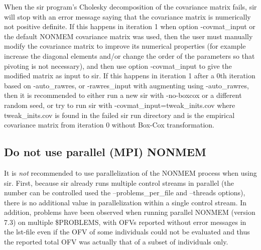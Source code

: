 When the sir program's Cholesky decomposition of the covariance matrix fails, 
sir will stop with an error message saying that the covariance matrix is numerically not positive definite. 
If this happens in iteration 1 when option -covmat\_input or the default NONMEM covariance matrix was used, 
then the user must manually modify the covariance matrix to improve its numerical properties (for example increase the diagonal elements
and/or change the order of the parameters so that pivoting is not necessary),
and then use option -covmat\_input to give the modified matrix as input to sir. 
If this happens in iteration 1 after a 0th iteration based on -auto\_rawres, or -rawres\_input with augmenting using -auto\_rawres, 
then it is recommended to either run a new sir with -no-boxcox or a different random seed, or 
try to run sir with -covmat\_input=tweak\_inits.cov where tweak\_inits.cov is found in the failed sir run directory and
is the empirical covariance matrix from iteration 0 without Box-Cox transformation.

\subsection*{Do not use parallel (MPI) NONMEM}
It is \emph{not} recommended to use parallelization of the NONMEM process when using sir.
First, because sir already runs multiple control streams in parallel (the number can be controlled
used the –problems\_per\_file and –threads options), there is no additional value in parallelization within
a single control stream.
In addition, problems have been observed when running parallel NONMEM (version 7.3) on multiple \$PROBLEMS,
with OFVs reported without error messages in the lst-file even if the OFV of some individuals could not be evaluated and
thus the reported total OFV was actually that of a subset of individuals only.





